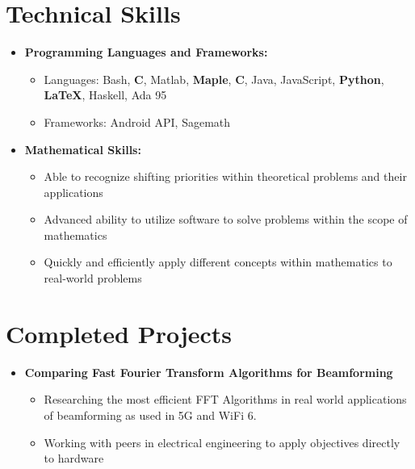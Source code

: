 \documentclass[11pt,letterpaper,sans]{moderncv}
\renewcommand{\_}{\textscale{.7}{\textunderscore}}
\newcommand{\Rplus}{\protect\hspace{-.1em}\protect\raisebox{.35ex}{\smaller{\smaller\textbf{+}}}}
\newcommand{\Cpp}{\mbox{C\Rplus\Rplus}\xspace}
\begin{document}
\section{Technical Skills}
\vspace{1em}
\begin{itemize}
\item \textbf{Programming Languages and Frameworks:}
\begin{itemize}
    \item {Languages:} Bash, \textbf{C}, Matlab, \textbf{Maple}, \textbf{\Cpp}, Java, JavaScript, \textbf{Python}, \textbf{\LaTeX}, Haskell, Ada 95
    \item {Frameworks:} Android API, Sagemath
\end{itemize}
\vspace{0.5em}
\item \textbf{Mathematical Skills:}
\begin{itemize}
    \item Able to recognize shifting priorities within theoretical problems and their applications
    \item Advanced ability to utilize software to solve problems within the scope of mathematics
    \item Quickly and efficiently apply different concepts within mathematics to real-world problems
\end{itemize}
\end{itemize}
\vspace{0.5em}


\section{Completed Projects}
\vspace{1em}
\begin{itemize}
\item \textbf{Comparing Fast Fourier Transform Algorithms for Beamforming}
\begin{itemize}
    \item Researching the most efficient FFT Algorithms in real world applications of beamforming as used in 5G and WiFi 6.
    \item Working with peers in electrical engineering to apply objectives directly to hardware
\end{itemize}
\end{itemize}
\vspace*{-5cm}
\end{document}
